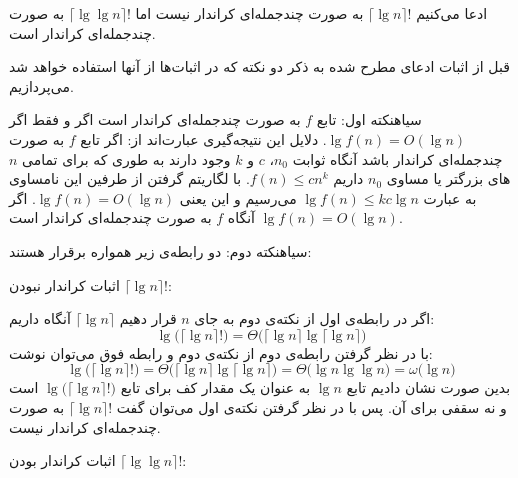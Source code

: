 
ادعا می‌کنیم {$\lceil \lg n \rceil !$} به صورت چندجمله‌ای کراندار نیست اما {$\lceil \lg \lg n \rceil !$} به صورت چندجمله‌ای کراندار است.

قبل از اثبات ادعای مطرح شده به ذکر دو نکته که در اثبات‌ها از آنها استفاده خواهد شد می‌پردازیم.

‌سیاه{نکته اول}: تابع {$f$} به صورت چندجمله‌ای کراندار است اگر و فقط اگر {$\lg f(n)=O(\lg n)$}. دلایل این نتیجه‌گیری عبارت‌اند از:
 اگر تابع {$f$} به صورت چندجمله‌ای کراندار باشد آنگاه ثوابت {$n_0$}، {$c$} و {$k$} وجود دارند به طوری که برای تمامی {$n$}های بزرگتر یا مساوی {$n_0$} داریم {$f(n)\leqslant cn^k$}. با لگاریتم گرفتن از طرفین این نامساوی به عبارت {$\lg f(n) \leqslant kc\lg n$} می‌رسیم و این یعنی {$\lg f(n)=O(\lg n)$}.
 اگر {$\lg f(n)=O(\lg n)$} آنگاه {$f$} به صورت چندجمله‌ای کراندار است.

‌سیاه{نکته دوم}: دو رابطه‌ی زیر همواره برقرار هستند:

اثبات کراندار نبودن {$\lceil \lg n \rceil !$}:

اگر در رابطه‌ی اول از نکته‌ی دوم به جای {$n$} قرار دهیم {$\lceil \lg n \rceil$} آنگاه داریم:
\begin{displaymath}
 \lg \bigl(\lceil \lg n \rceil !\bigr) = \Theta \bigl(\lceil \lg n \rceil \lg \lceil \lg n \rceil \bigr)
\end{displaymath}
با در نظر گرفتن رابطه‌ی دوم از نکته‌ی دوم و رابطه فوق می‌توان نوشت:
\begin{displaymath}
 \lg \bigl(\lceil \lg n \rceil !\bigr) =\Theta \bigl(\lceil \lg n \rceil \lg \lceil \lg n \rceil \bigr) = \Theta \bigl(\lg n \lg \lg n \bigr)=\omega \bigl( \lg n \bigr)
\end{displaymath}
بدین صورت نشان دادیم تابع {$\lg n$} به عنوان یک مقدار کف برای تابع {$ \lg \bigl(\lceil \lg n \rceil !\bigr)$} است و نه سقفی برای آن. پس با در نظر گرفتن نکته‌ی اول می‌توان گفت {$\lceil \lg n \rceil !$} به صورت چندجمله‌ای کراندار نیست.

اثبات کراندار بودن {$\lceil \lg \lg n \rceil !$}:

